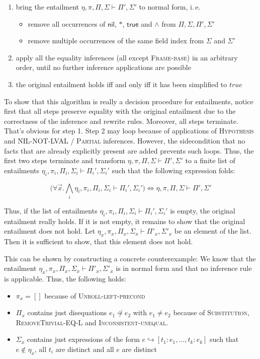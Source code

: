 \documentclass{scrartcl}
\theoremstyle{definition}
\newcommand{\nil}{{\textsf{nil}}}
\newcommand{\pftrue}{{\textsf{true}}}
\newcommand{\pfunequal}[2]{\ensuremath{#1 \not\doteq #2}}
\newcommand{\sfpointsto}[2]{#1 \hookrightarrow [#2]}
\begin{document}
\begin{enumerate}
\item bring the entailment ${\eta,\pi,\Pi,\Sigma}\vdash{\Pi',\Sigma'}$ to
  normal form, i.\,e.\:
  \begin{itemize}
  \item remove all occurrences of $\nil$, $*$, $\pftrue$ and $\wedge$ from
    $\Pi, \Sigma, \Pi', \Sigma'$ 
  \item remove multiple occurrences of the same field index from $\Sigma$ and $\Sigma'$
  \end{itemize}
\item apply all the equality inferences (all except \textsc{Frame-base}) in an
  arbitrary order, until no further inference applications are possible
\item the original entailment holds iff and only iff it has been simplified to $\textit{true}$
\end{enumerate}

To show that this algorithm is really a decision procedure for entailments,
notice first that all steps preserve equality with the original entailment due
to the correctness of the inference and rewrite rules. Moreover, all steps
terminate. That's obvious for step 1. Step 2 may loop because of applications
of \textsc{Hypothesis} and \textsc{NIL-NOT-LVAL} / \textsc{Partial}
inferences. However, the sidecondition that no facts that are already
explicitly present are added prevents such loops.  Thus, the first two steps
terminate and transform ${\eta,\pi,\Pi,\Sigma}\vdash{\Pi',\Sigma'}$ to a
finite list of entailments
${\eta_i,\pi_i,\Pi_i,\Sigma_i}\vdash{\Pi_i',\Sigma_i'}$ such that the
following expression folds:

\[\big(\forall \vec{x}. \bigwedge_i
{\eta_i,\pi_i,\Pi_i,\Sigma_i}\vdash{\Pi_i',\Sigma_i'}\big) \Longleftrightarrow
{\eta,\pi,\Pi,\Sigma}\vdash{\Pi',\Sigma'}
\]


Thus, if the list of entailments
${\eta_i,\pi_i,\Pi_i,\Sigma_i}\vdash{\Pi_i',\Sigma_i'}$ is empty, the original
entailment really holds. If it is not empty, it remains to show that 
the original entailment does not hold. Let 
${\eta_x,\pi_x,\Pi_x,\Sigma_x}\vdash{\Pi'_x,\Sigma'_x}$ be an element of the
list. Then it is sufficient to show, that this element does not hold.

This can be shown by constructing a concrete counterexample: We know that the
entailment ${\eta_x,\pi_x,\Pi_x,\Sigma_x}\vdash{\Pi'_x,\Sigma'_x}$ is in
normal form and that no inference rule is applicable. Thus, the following
holds:
\begin{itemize}
\item $\pi_x = []$ because of \textsc{Unroll-left-precond}
\item $\Pi_x$ contains just disequations $\pfunequal {e_1} {e_2}$ with $e_1
  \not = e_2$ because of \textsc{Substitution}, \textsc{RemoveTrivial-EQ-L} and \textsc{Inconsistent-unequal}.
\item $\Sigma_x$ contains just expressions of the form $\sfpointsto e
  {t_1:e_1, \ldots, t_k:e_k}$ such that $e \not\in \eta_x$, all $t_i$ are
  distinct and all $e$ are distinct
\end{itemize}
\end{document}
